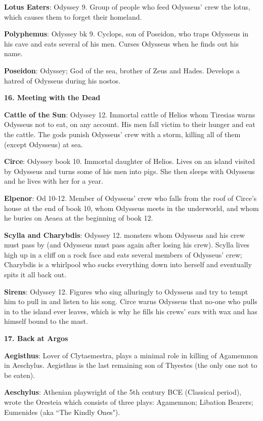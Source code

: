 \documentclass{scrartcl}
\begin{document}
\begin{multicols*}{3}
{\bf Lotus Eaters}: Odyssey 9. Group of people who feed Odysseus' crew the lotus, which causes them to forget their homeland.

{\bf Polyphemus}: Odyssey bk 9. Cyclops, son of Poseidon, who traps Odysseus in his cave and eats several of his men. Curses Odysseus when he finds out his name.

{\bf Poseidon}: Odyssey; God of the sea, brother of Zeus and Hades. Develops a hatred of Odysseus during his nostos.


{\bf 16. Meeting with the Dead}

{\bf Cattle of the Sun}: Odyssey 12. Immortal cattle of Helios whom Tiresias warns Odysseus not to eat, on any account. His men fall victim to their hunger and eat the cattle. The gods punish Odysseus' crew with a storm, killing all of them (except Odysseus) at sea.

{\bf Circe}: Odyssey book 10. Immortal daughter of Helios. Lives on an island visited by Odysseus and turns some of his men into pigs. She then sleeps with Odysseus and he lives with her for a year.

{\bf Elpenor}: Od 10-12. Member of Odysseus' crew who falls from the roof of Circe's house at the end of book 10, whom Odysseus meets in the underworld, and whom he buries on Aeaea at the beginning of book 12.

{\bf Scylla and Charybdis}: Odyssey 12. monsters whom Odysseus and his crew must pass by (and Odysseus must pass again after losing his crew). Scylla lives high up in a cliff on a rock face and eats several members of Odysseus' crew; Charybdis is a whirlpool who sucks everything down into herself and eventually spits it all back out.

{\bf Sirens}: Odyssey 12. Figures who sing alluringly to Odysseus and try to tempt him to pull in and listen to his song. Circe warns Odysseus that no-one who pulls in to the island ever leaves, which is why he fills his crews' ears with wax and has himself bound to the mast.


{\bf 17. Back at Argos}

{\bf Aegisthus}: Lover of Clytaemestra, plays a minimal role in killing of Agamemnon in Aeschylus. Aegisthus is the last remaining son of Thyestes (the only one not to be eaten).

{\bf Aeschylus}: Athenian playwright of the 5th century BCE (Classical period), wrote the Oresteia which consists of three plays: Agamemnon; Libation Bearers; Eumenides (aka ``The Kindly Ones").


\end{multicols*}
\end{document}
